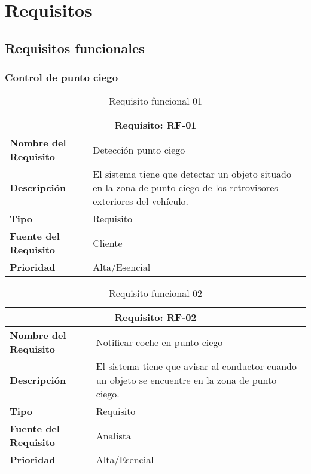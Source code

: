 

\section{Requisitos}
\subsection{Requisitos funcionales}


\subsubsection{Control de punto ciego}

\begin{table}[H]
\begin{center}
\begin{tabular}{p{} p{7cm}}
\multicolumn{2}{c}{\textbf{Requisito: RF-01} } \\
\hline \hline
\textbf{Nombre del Requisito} & Detección punto ciego  \\
\hline
\textbf{Descripción} & El sistema tiene que detectar un objeto situado en la zona de punto ciego de los retrovisores exteriores del vehículo.  \\
\hline
\textbf{Tipo} & Requisito  \\
\hline
\textbf{Fuente del Requisito} & Cliente  \\
\hline
\textbf{Prioridad} & Alta/Esencial  \\ \hline
\end{tabular}
\caption{Requisito funcional 01}
\label{tab:RF-01}
\end{center}
\end{table}

\begin{table}[H]
\begin{center}
\begin{tabular}{p{} p{7cm}}
\multicolumn{2}{c}{\textbf{Requisito: RF-02} } \\
\hline \hline
\textbf{Nombre del Requisito} & Notificar coche en punto ciego  \\
\hline
\textbf{Descripción} & El sistema tiene que avisar al conductor cuando un objeto se encuentre en la zona de punto ciego. \\
\hline
\textbf{Tipo} & Requisito  \\
\hline
\textbf{Fuente del Requisito} & Analista  \\
\hline
\textbf{Prioridad} & Alta/Esencial  \\ \hline
\end{tabular}
\caption{Requisito funcional 02}
\label{tab:RF-02}
\end{center}
\end{table}

